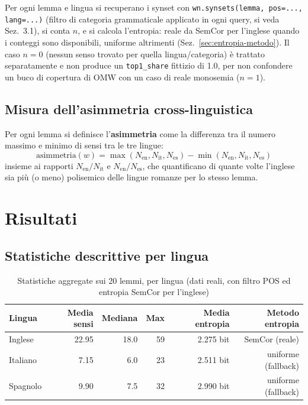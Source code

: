 \documentclass[12pt,a4paper]{article}
\begin{document}
Per ogni lemma e lingua si recuperano i synset con \texttt{wn.synsets(lemma, pos=..., lang=...)} (filtro di categoria grammaticale applicato in ogni query, si veda Sez.~3.1), si conta $n$, e si calcola l'entropia: reale da SemCor per l'inglese quando i conteggi sono disponibili, uniforme altrimenti (Sez.~\ref{sec:entropia-metodo}). Il caso $n=0$ (nessun senso trovato per quella lingua/categoria) \`e trattato separatamente e non produce un \texttt{top1\_share} fittizio di 1.0, per non confondere un buco di copertura di OMW con un caso di reale monosemia ($n=1$).

\subsection{Misura dell'asimmetria cross-linguistica}

Per ogni lemma si definisce l'\textbf{asimmetria} come la differenza tra il numero massimo e minimo di sensi tra le tre lingue:
\[
  \text{asimmetria}(w) = \max(N_{\text{en}}, N_{\text{it}}, N_{\text{es}}) - \min(N_{\text{en}}, N_{\text{it}}, N_{\text{es}})
\]
insieme ai rapporti $N_{\text{en}}/N_{\text{it}}$ e $N_{\text{en}}/N_{\text{es}}$, che quantificano di quante volte l'inglese sia pi\`u (o meno) polisemico delle lingue romanze per lo stesso lemma.

\section{Risultati}

\subsection{Statistiche descrittive per lingua}

\begin{table}[H]
  \centering
  \caption{Statistiche aggregate sui 20 lemmi, per lingua (dati reali, con filtro POS ed entropia SemCor per l'inglese)}
  \begin{tabular}{lrrrrr}
    \toprule
    \textbf{Lingua} & \textbf{Media sensi} & \textbf{Mediana} & \textbf{Max} & \textbf{Media entropia} & \textbf{Metodo entropia} \\
    \midrule
    Inglese  & 22.95 & 18.0 &  59 & 2.275 bit & SemCor (reale) \\
    Italiano &  7.15 &  6.0 &  23 & 2.511 bit & uniforme (fallback) \\
    Spagnolo &  9.90 &  7.5 &  32 & 2.990 bit & uniforme (fallback) \\
    \bottomrule
  \end{tabular}
\end{table}
\end{document}
